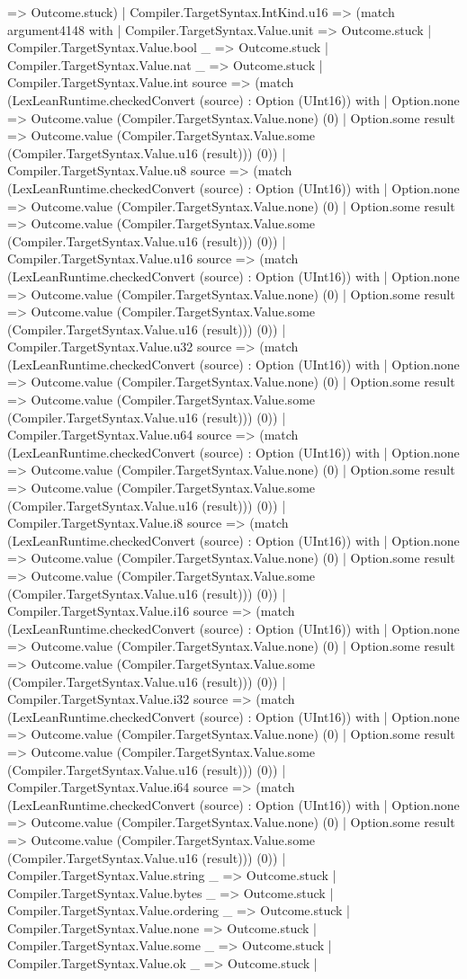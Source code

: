 \documentclass[11pt]{article}
\begin{document}
=> Outcome.stuck) | Compiler.TargetSyntax.IntKind.u16 => (match argument4148 with | Compiler.TargetSyntax.Value.unit => Outcome.stuck | Compiler.TargetSyntax.Value.bool \_ => Outcome.stuck | Compiler.TargetSyntax.Value.nat \_ => Outcome.stuck | Compiler.TargetSyntax.Value.int source => (match (LexLeanRuntime.checkedConvert (source) : Option (UInt16)) with | Option.none => Outcome.value (Compiler.TargetSyntax.Value.none) (0) | Option.some result => Outcome.value (Compiler.TargetSyntax.Value.some (Compiler.TargetSyntax.Value.u16 (result))) (0)) | Compiler.TargetSyntax.Value.u8 source => (match (LexLeanRuntime.checkedConvert (source) : Option (UInt16)) with | Option.none => Outcome.value (Compiler.TargetSyntax.Value.none) (0) | Option.some result => Outcome.value (Compiler.TargetSyntax.Value.some (Compiler.TargetSyntax.Value.u16 (result))) (0)) | Compiler.TargetSyntax.Value.u16 source => (match (LexLeanRuntime.checkedConvert (source) : Option (UInt16)) with | Option.none => Outcome.value (Compiler.TargetSyntax.Value.none) (0) | Option.some result => Outcome.value (Compiler.TargetSyntax.Value.some (Compiler.TargetSyntax.Value.u16 (result))) (0)) | Compiler.TargetSyntax.Value.u32 source => (match (LexLeanRuntime.checkedConvert (source) : Option (UInt16)) with | Option.none => Outcome.value (Compiler.TargetSyntax.Value.none) (0) | Option.some result => Outcome.value (Compiler.TargetSyntax.Value.some (Compiler.TargetSyntax.Value.u16 (result))) (0)) | Compiler.TargetSyntax.Value.u64 source => (match (LexLeanRuntime.checkedConvert (source) : Option (UInt16)) with | Option.none => Outcome.value (Compiler.TargetSyntax.Value.none) (0) | Option.some result => Outcome.value (Compiler.TargetSyntax.Value.some (Compiler.TargetSyntax.Value.u16 (result))) (0)) | Compiler.TargetSyntax.Value.i8 source => (match (LexLeanRuntime.checkedConvert (source) : Option (UInt16)) with | Option.none => Outcome.value (Compiler.TargetSyntax.Value.none) (0) | Option.some result => Outcome.value (Compiler.TargetSyntax.Value.some (Compiler.TargetSyntax.Value.u16 (result))) (0)) | Compiler.TargetSyntax.Value.i16 source => (match (LexLeanRuntime.checkedConvert (source) : Option (UInt16)) with | Option.none => Outcome.value (Compiler.TargetSyntax.Value.none) (0) | Option.some result => Outcome.value (Compiler.TargetSyntax.Value.some (Compiler.TargetSyntax.Value.u16 (result))) (0)) | Compiler.TargetSyntax.Value.i32 source => (match (LexLeanRuntime.checkedConvert (source) : Option (UInt16)) with | Option.none => Outcome.value (Compiler.TargetSyntax.Value.none) (0) | Option.some result => Outcome.value (Compiler.TargetSyntax.Value.some (Compiler.TargetSyntax.Value.u16 (result))) (0)) | Compiler.TargetSyntax.Value.i64 source => (match (LexLeanRuntime.checkedConvert (source) : Option (UInt16)) with | Option.none => Outcome.value (Compiler.TargetSyntax.Value.none) (0) | Option.some result => Outcome.value (Compiler.TargetSyntax.Value.some (Compiler.TargetSyntax.Value.u16 (result))) (0)) | Compiler.TargetSyntax.Value.string \_ => Outcome.stuck | Compiler.TargetSyntax.Value.bytes \_ => Outcome.stuck | Compiler.TargetSyntax.Value.ordering \_ => Outcome.stuck | Compiler.TargetSyntax.Value.none => Outcome.stuck | Compiler.TargetSyntax.Value.some \_ => Outcome.stuck | Compiler.TargetSyntax.Value.ok \_ => Outcome.stuck | 
\end{document}
